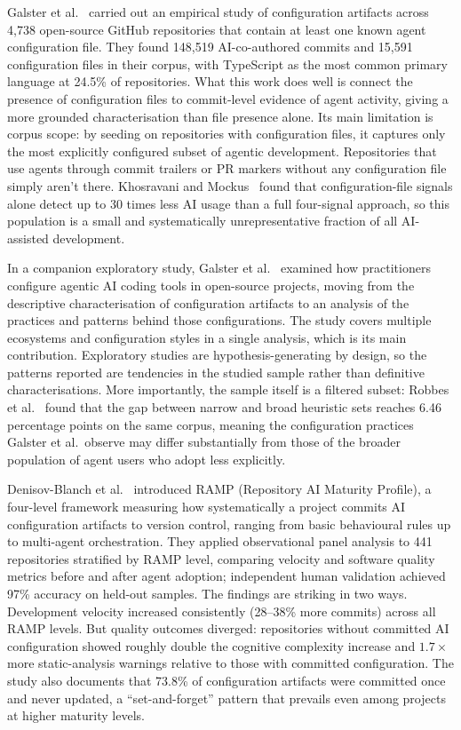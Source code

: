 Galster et al.~\cite{galsterConfig2026} carried out an empirical study of
configuration artifacts across 4,738 open-source GitHub repositories that contain
at least one known agent configuration file. They found 148,519 AI-co-authored
commits and 15,591 configuration files in their corpus, with TypeScript as the most
common primary language at 24.5\% of repositories. What this work does well is connect
the presence of configuration files to commit-level evidence of agent activity, giving
a more grounded characterisation than file presence alone. Its main limitation is
corpus scope: by seeding on repositories with configuration files, it captures only
the most explicitly configured subset of agentic development. Repositories that use
agents through commit trailers or PR markers without any configuration file simply
aren't there. Khosravani and Mockus~\cite{khosravani2026} found that
configuration-file signals alone detect up to 30 times less AI usage than a full
four-signal approach, so this population is a small and systematically
unrepresentative fraction of all AI-assisted development.

In a companion exploratory study, Galster et al.~\cite{galsterExploratory2026}
examined how practitioners configure agentic AI coding tools in open-source projects,
moving from the descriptive characterisation of configuration artifacts to an analysis
of the practices and patterns behind those configurations. The study covers multiple
ecosystems and configuration styles in a single analysis, which is its main
contribution. Exploratory studies are hypothesis-generating by design, so the patterns
reported are tendencies in the studied sample rather than definitive characterisations.
More importantly, the sample itself is a filtered subset: Robbes et al.~\cite{robbesAgenticMuch2026}
found that the gap between narrow and broad heuristic sets reaches 6.46 percentage
points on the same corpus, meaning the configuration practices Galster et al.\ observe
may differ substantially from those of the broader population of agent users who
adopt less explicitly.

Denisov-Blanch et al.~\cite{denisovBlanch2026} introduced RAMP (Repository AI
Maturity Profile), a four-level framework measuring how systematically a project
commits AI configuration artifacts to version control, ranging from basic behavioural
rules up to multi-agent orchestration. They applied observational panel analysis to
441 repositories stratified by RAMP level, comparing velocity and software quality
metrics before and after agent adoption; independent human validation achieved 97\%
accuracy on held-out samples. The findings are striking in two ways. Development
velocity increased consistently (28--38\% more commits) across all RAMP levels. But
quality outcomes diverged: repositories without committed AI configuration showed
roughly double the cognitive complexity increase and $1.7\times$ more static-analysis
warnings relative to those with committed configuration. The study also documents
that 73.8\% of configuration artifacts were committed once and never updated, a
``set-and-forget'' pattern that prevails even among projects at higher maturity
levels.

